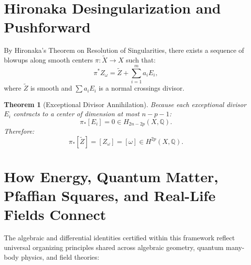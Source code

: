 \documentclass[11pt,a4paper]{article}
\newtheorem{theorem}{Theorem}[section]
\theoremstyle{definition}
\begin{document}
\section{Hironaka Desingularization and Pushforward}

By Hironaka's Theorem on Resolution of Singularities, there exists a sequence of blowups along smooth centers $\pi : \tilde{X} \to X$ such that:
\begin{equation}
  \pi^* Z_\omega = \tilde{Z} + \sum_{i=1}^m a_i E_i,
\end{equation}
where $\tilde{Z}$ is smooth and $\sum a_i E_i$ is a normal crossings divisor.
\begin{theorem}[Exceptional Divisor Annihilation]
Because each exceptional divisor $E_i$ contracts to a center of dimension at most $n - p - 1$:
\begin{equation}
  \pi_* [E_i] = 0 \in H_{2n-2p}(X, \mathbb{Q}).
\end{equation}
Therefore:
\begin{equation}
  \pi_* [\tilde{Z}] = [Z_\omega] = [\omega] \in H^{2p}(X, \mathbb{Q}).
\end{equation}
\end{theorem}


\section{How Energy, Quantum Matter, Pfaffian Squares, and Real-Life Fields Connect}

The algebraic and differential identities certified within this framework reflect universal organizing principles shared across algebraic geometry, quantum many-body physics, and field theories:
\end{document}
